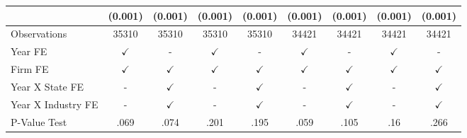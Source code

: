 {\begin{tabular}{l*{8}{c}}
                    &     (0.001)         &     (0.001)         &     (0.001)         &     (0.001)         &     (0.001)         &     (0.001)         &     (0.001)         &     (0.001)         \\
\midrule
Observations        &       35310         &       35310         &       35310         &       35310         &       34421         &       34421         &       34421         &       34421         \\
Year FE             &$\checkmark$         &           -         &$\checkmark$         &           -         &$\checkmark$         &           -         &$\checkmark$         &           -         \\
Firm FE             &$\checkmark$         &$\checkmark$         &$\checkmark$         &$\checkmark$         &$\checkmark$         &$\checkmark$         &$\checkmark$         &$\checkmark$         \\
Year X State FE     &           -         &$\checkmark$         &           -         &$\checkmark$         &           -         &$\checkmark$         &           -         &$\checkmark$         \\
Year X Industry FE  &           -         &$\checkmark$         &           -         &$\checkmark$         &           -         &$\checkmark$         &           -         &$\checkmark$         \\
P-Value Test        &        .069         &        .074         &        .201         &        .195         &        .059         &        .105         &         .16         &        .266         \\
\bottomrule
\end{tabular}
}
